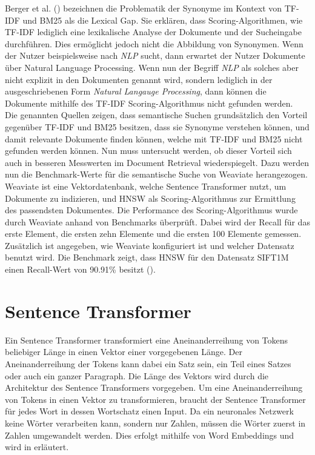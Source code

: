 Berger et al. (\citeyear{Berger_Caruana_Cohn_Freitag_Mittal_2000}) bezeichnen die Problematik der Synonyme im Kontext von TF-IDF und BM25 als die Lexical Gap.
Sie erklären, dass Scoring-Algorithmen, wie TF-IDF lediglich eine lexikalische Analyse der Dokumente und der Sucheingabe durchführen.
Dies ermöglicht jedoch nicht die Abbildung von Synonymen.
Wenn der Nutzer beispielsweise nach \textit{NLP} sucht, dann erwartet der Nutzer Dokumente über Natural Language Processing.
Wenn nun der Begriff \textit{NLP} als solches aber nicht explizit in den Dokumenten genannt wird, sondern lediglich in der ausgeschriebenen Form \textit{Natural Langauge Processing}, dann können die Dokumente mithilfe des TF-IDF Scoring-Algorithmus nicht gefunden werden.\\

Die genannten Quellen zeigen, dass semantische Suchen grundsätzlich den Vorteil gegenüber TF-IDF und BM25 besitzen, dass sie Synonyme verstehen können, und damit relevante Dokumente finden können, welche mit TF-IDF und BM25 nicht gefunden werden können.
Nun muss untersucht werden, ob dieser Vorteil sich auch in besseren Messwerten im Document Retrieval wiederspiegelt.
Dazu werden nun die Benchmark-Werte für die semantische Suche von Weaviate herangezogen. 
Weaviate ist eine Vektordatenbank, welche Sentence Transformer nutzt, um Dokumente zu indizieren, und HNSW als Scoring-Algorithmus zur Ermittlung des passendsten Dokumentes.
Die Performance des Scoring-Algorithmus wurde durch Weaviate anhand von Benchmarks überprüft.
Dabei wird der Recall für das erste Element, die ersten zehn Elemente und die ersten 100 Elemente gemessen.
Zusätzlich ist angegeben, wie Weaviate konfiguriert ist und welcher Datensatz benutzt wird.
Die Benchmark zeigt, dass HNSW für den Datensatz SIFT1M einen Recall-Wert von 90.91\% besitzt (\cite{Weaviate_Benchmark}).

\section{Sentence Transformer}
\label{chap:sentence-transformer}

Ein Sentence Transformer transformiert eine Aneinanderreihung von Tokens beliebiger Länge in einen Vektor einer vorgegebenen Länge.
Der Aneinanderreihung der Tokens kann dabei ein Satz sein, ein Teil eines Satzes oder auch ein ganzer Paragraph.
Die Länge des Vektors wird durch die Architektur des Sentence Transformers vorgegeben.
Um eine Aneinanderreihung von Tokens in einen Vektor zu transformieren, braucht der Sentence Transformer für jedes Wort in dessen Wortschatz einen Input.
Da ein neuronales Netzwerk keine Wörter verarbeiten kann, sondern nur Zahlen, müssen die Wörter zuerst in Zahlen umgewandelt werden.
Dies erfolgt mithilfe von Word Embeddings und wird in  erläutert.\\

